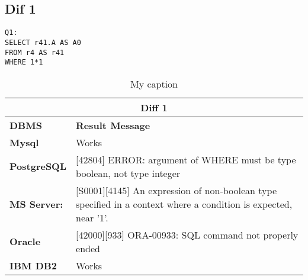 \subsection{Dif 1}

\begin{mdframed}[backgroundcolor=gray!20] 
\begin{lstlisting}
Q1:
SELECT r41.A AS A0
FROM r4 AS r41
WHERE 1*1
\end{lstlisting}
\end{mdframed}

\begin{table}[h]
\centering
\caption{My caption}
\label{my-label}
\begin{tabular}{|p{2cm}|p{12cm}|}
\hline
\multicolumn{2}{|c|}{\textbf{Diff 1}}                                                                                                                                                       \\ \hline
\textbf{DBMS}                              & \textbf{Result Message}                                                                                                                        \\ \hline
{\color[HTML]{333333} \textbf{Mysql}}      & {\color[HTML]{333333} Works}                                                                                                                   \\ \hline
{\color[HTML]{333333} \textbf{PostgreSQL}} & {\color[HTML]{333333} {[}42804{]} ERROR: argument of WHERE must be type boolean, not type integer}                                             \\ \hline
{\color[HTML]{333333} \textbf{MS Server:}} & {\color[HTML]{333333} {[}S0001{]}{[}4145{]} An expression of non-boolean type specified in a context where a condition is expected, near '1'.} \\ \hline
\textbf{Oracle}                            & {[}42000{]}{[}933{]} ORA-00933: SQL command not properly ended                                                                                 \\ \hline
\textbf{IBM DB2}                           & Works                                                                                                                                          \\ \hline
\end{tabular}
\end{table}

